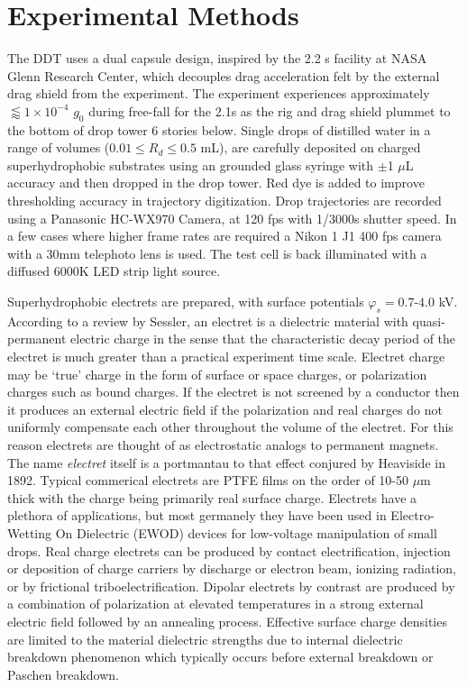 \documentclass[12pt,a4paper,oneside]{book}
\begin{document}
\section{Experimental Methods}
The DDT uses a dual capsule design, inspired by the 2.2 s facility at NASA Glenn Research Center, which decouples drag acceleration felt by the external drag shield from the experiment. The experiment experiences approximately $\lessapprox 1 \times 10^{-4}$ $g_0$ during free-fall for the 2.1s as the rig and drag shield plummet to the bottom of drop tower 6 stories below. Single drops of distilled water in a range of volumes ($0.01 \leq R_d \leq 0.5$ mL), are carefully deposited on charged superhydrophobic substrates using an grounded glass syringe with $\pm $1 $\mu$L accuracy and then dropped in the drop tower. Red dye is added to improve thresholding accuracy in trajectory digitization. Drop trajectories are recorded using a Panasonic HC-WX970 Camera, at 120 fps with 1/3000s shutter speed. In a few cases where higher frame rates are required a Nikon 1 J1 400 fps camera with a 30mm telephoto lens is used. The test cell is back illuminated with a diffused 6000K LED strip light source.  

Superhydrophobic electrets are prepared, with surface potentials $\varphi_s = 0.7$-$4.0$ kV. According to a review by Sessler\cite{sessler_electrets_1987}, an electret is a dielectric material with quasi-permanent electric charge in the sense that the characteristic decay period of the electret is much greater than a practical experiment time scale. Electret charge may be `true' charge in the form of surface or space charges, or polarization charges such as bound charges. If the electret is not screened by a conductor then it produces an external electric field if the polarization and real charges do not uniformly compensate each other throughout the volume of the electret. For this reason electrets are thought of as electrostatic analogs to permanent magnets. The name \emph{electret} itself is a portmantau to that effect conjured by Heaviside in 1892\cite{heaviside_electrical_2011}. Typical commerical electrets are PTFE films on the order of 10-50 $\mu$m thick with the charge being primarily real surface charge. Electrets have a plethora of applications, but most germanely they have been used in Electro-Wetting On Dielectric (EWOD) devices for low-voltage manipulation of small drops\cite{wu_low-voltage_2010}. Real charge electrets can be produced by contact electrification, injection or deposition of charge carriers by discharge or electron beam, ionizing radiation, or by frictional triboelectrification. Dipolar electrets by contrast are produced by a combination of polarization at elevated temperatures in a strong external electric field followed by an annealing process. Effective surface charge densities are limited to the material dielectric strengths due to internal dielectric breakdown phenomenon which typically occurs before external breakdown or Paschen breakdown. 
\end{document}
